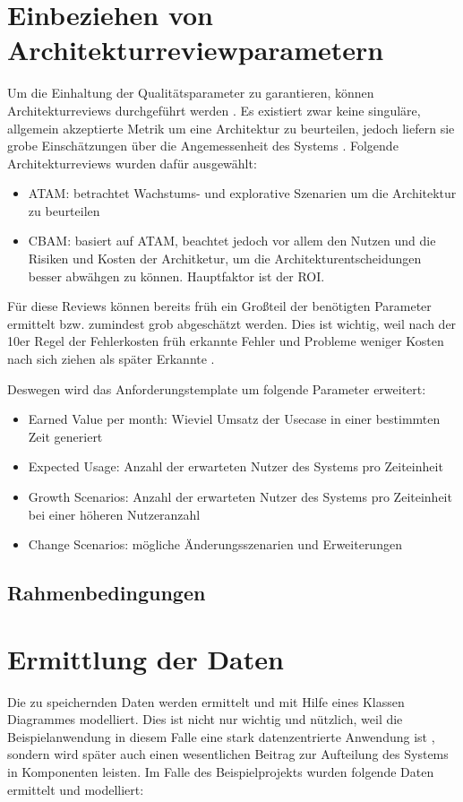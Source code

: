 \section{Einbeziehen von Architekturreviewparametern}
Um die Einhaltung der Qualitätsparameter zu garantieren, können Architekturreviews durchgeführt werden \cite[S. 20]{review}. Es existiert zwar \glqq keine singuläre, allgemein akzeptierte Metrik um eine Architektur zu beurteilen\grqq \cite[S. 19]{review}, jedoch liefern sie grobe Einschätzungen über die Angemessenheit des Systems \cite[S. 20]{review}. Folgende Architekturreviews wurden dafür ausgewählt:

\begin{itemize}
  \item ATAM: betrachtet Wachstums- und explorative Szenarien um die Architektur zu beurteilen \cite[S. 61]{review}
  \item CBAM: basiert auf ATAM, beachtet jedoch vor allem den Nutzen und die Risiken und Kosten der Architketur, um die Architekturentscheidungen besser abwähgen zu können. Hauptfaktor ist der ROI. \cite[S. 67]{review}
\end{itemize}

Für diese Reviews können bereits früh ein Großteil der benötigten Parameter ermittelt bzw. zumindest grob abgeschätzt werden. Dies ist wichtig, weil nach der 10er Regel der Fehlerkosten früh erkannte Fehler und Probleme weniger Kosten nach sich ziehen als später Erkannte \cite[S. 154]{fehler}.

Deswegen wird das Anforderungstemplate um folgende Parameter erweitert:

\begin{itemize}
  \item Earned Value per month: Wieviel Umsatz der Usecase in einer bestimmten Zeit generiert
  \item Expected Usage: Anzahl der erwarteten Nutzer des Systems pro Zeiteinheit
  \item Growth Scenarios: Anzahl der erwarteten Nutzer des Systems pro Zeiteinheit bei einer höheren Nutzeranzahl
  \item Change Scenarios: mögliche Änderungsszenarien und Erweiterungen
\end{itemize}

\subsection{Rahmenbedingungen}


\section{Ermittlung der Daten}
Die zu speichernden Daten werden ermittelt und mit Hilfe eines Klassen Diagrammes modelliert. Dies ist nicht nur wichtig und nützlich, weil die Beispielanwendung in diesem Falle eine stark datenzentrierte Anwendung ist \cite[S. 105]{effektiv}, sondern wird später auch einen wesentlichen Beitrag zur Aufteilung des Systems in Komponenten leisten. Im Falle des Beispielprojekts wurden folgende Daten ermittelt und modelliert:

